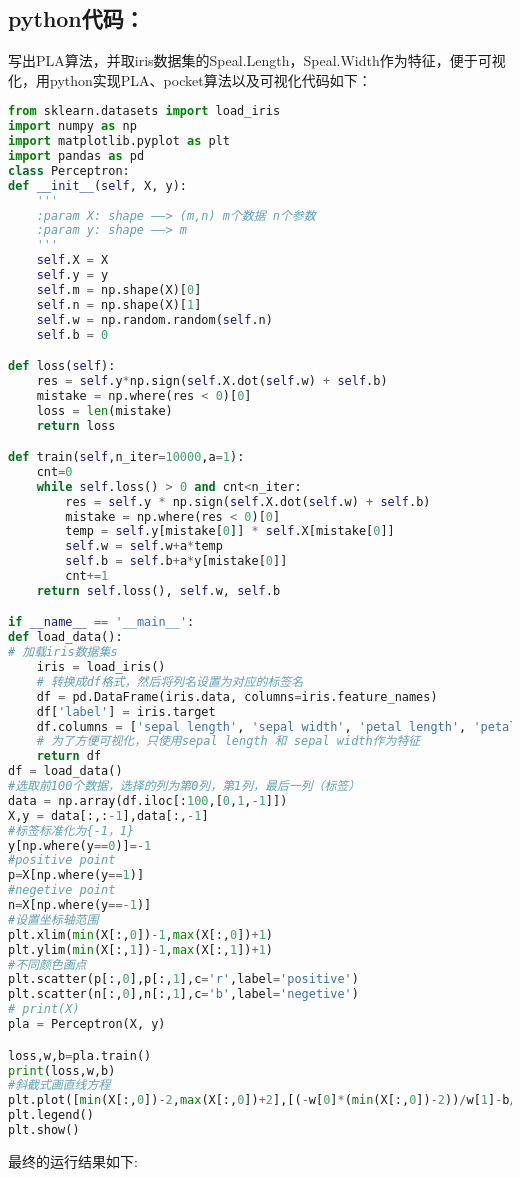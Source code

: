 \documentclass[twoside]{article}
\begin{document}
\subsection*{python代码：}
写出PLA算法，并取iris数据集的Speal.Length，Speal.Width作为特征，便于可视化，用python实现PLA、pocket算法以及可视化代码如下：
\begin{lstlisting}[language = {python}]
from sklearn.datasets import load_iris
import numpy as np
import matplotlib.pyplot as plt
import pandas as pd
class Perceptron:
def __init__(self, X, y):
    '''
    :param X: shape ——> (m,n) m个数据 n个参数
    :param y: shape ——> m
    '''
    self.X = X
    self.y = y
    self.m = np.shape(X)[0]
    self.n = np.shape(X)[1]
    self.w = np.random.random(self.n)
    self.b = 0

def loss(self):
    res = self.y*np.sign(self.X.dot(self.w) + self.b)
    mistake = np.where(res < 0)[0]
    loss = len(mistake)
    return loss

def train(self,n_iter=10000,a=1):
    cnt=0
    while self.loss() > 0 and cnt<n_iter:
        res = self.y * np.sign(self.X.dot(self.w) + self.b)
        mistake = np.where(res < 0)[0]
        temp = self.y[mistake[0]] * self.X[mistake[0]]
        self.w = self.w+a*temp
        self.b = self.b+a*y[mistake[0]]
        cnt+=1
    return self.loss(), self.w, self.b

if __name__ == '__main__':
def load_data():
# 加载iris数据集s
    iris = load_iris()
    # 转换成df格式，然后将列名设置为对应的标签名
    df = pd.DataFrame(iris.data, columns=iris.feature_names)
    df['label'] = iris.target
    df.columns = ['sepal length', 'sepal width', 'petal length', 'petal width', 'label']
    # 为了方便可视化，只使用sepal length 和 sepal width作为特征
    return df
df = load_data()
#选取前100个数据，选择的列为第0列，第1列，最后一列（标签）
data = np.array(df.iloc[:100,[0,1,-1]])
X,y = data[:,:-1],data[:,-1]
#标签标准化为{-1，1}
y[np.where(y==0)]=-1
#positive point
p=X[np.where(y==1)]
#negetive point
n=X[np.where(y==-1)]
#设置坐标轴范围
plt.xlim(min(X[:,0])-1,max(X[:,0])+1)
plt.ylim(min(X[:,1])-1,max(X[:,1])+1)
#不同颜色画点
plt.scatter(p[:,0],p[:,1],c='r',label='positive')
plt.scatter(n[:,0],n[:,1],c='b',label='negetive')
# print(X)
pla = Perceptron(X, y)

loss,w,b=pla.train()
print(loss,w,b)
#斜截式画直线方程
plt.plot([min(X[:,0])-2,max(X[:,0])+2],[(-w[0]*(min(X[:,0])-2))/w[1]-b/w[1],-w[0]*(max(X[:,0])+2)/w[1]-b/w[1]],c='g')
plt.legend()
plt.show()
\end{lstlisting}
最终的运行结果如下:
\end{document}
